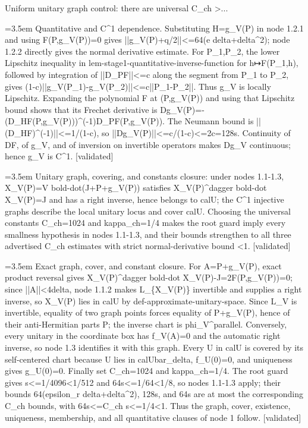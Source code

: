 \documentclass{article}
\newcommand{\step}[1]{\par\noindent\hangindent=3.5em\hangafter=1%
  \makebox[3.5em][l]{\textbf{#1.}}}
\newcommand{\steptag}[1]{\hfill{\small\textsf{[#1]}}}
\begin{document}
\begin{proofbox}{Uniform unitary graph control: there are universal C\_ch >...}
\step{1.3.2} Quantitative and C\textasciicircum{}1 dependence. Substituting H=g\_V(P) in node 1.2.1 and using F(P,g\_V(P))=0 gives ||g\_V(P)+q/2||<=64(e delta+delta\textasciicircum{}2); node 1.2.2 directly gives the normal derivative estimate. For P\_1,P\_2, the lower Lipschitz inequality in lem-stage1-quantitative-inverse-function for h↦F(P\_1,h), followed by integration of ||D\_PF||<=c along the segment from P\_1 to P\_2, gives (1-c)||g\_V(P\_1)-g\_V(P\_2)||<=c||P\_1-P\_2||. Thus g\_V is locally Lipschitz. Expanding the polynomial F at (P,g\_V(P)) and using that Lipschitz bound shows that its Frechet derivative is Dg\_V(P)=-(D\_HF(P,g\_V(P)))\textasciicircum{}(-1)D\_PF(P,g\_V(P)). The Neumann bound is ||(D\_HF)\textasciicircum{}(-1)||<=1/(1-c), so ||Dg\_V(P)||<=c/(1-c)<=2c=128s. Continuity of DF, of g\_V, and of inversion on invertible operators makes Dg\_V continuous; hence g\_V is C\textasciicircum{}1. \steptag{validated} \\[4pt]
\step{1.4} Unitary graph, covering, and constants closure: under nodes 1.1-1.3, X\_V(P)=V bold-dot(J+P+g\_V(P)) satisfies X\_V(P)\textasciicircum{}dagger bold-dot X\_V(P)=J and has a right inverse, hence belongs to calU; the C\textasciicircum{}1 injective graphs describe the local unitary locus and cover calU. Choosing the universal constants C\_ch=1024 and kappa\_ch=1/4 makes the root guard imply every smallness hypothesis in nodes 1.1-1.3, and their bounds strengthen to all three advertised C\_ch estimates with strict normal-derivative bound <1. \steptag{validated} \\[6pt]
\step{1.4.1} Exact graph, cover, and constant closure. For A=P+g\_V(P), exact product reversal gives X\_V(P)\textasciicircum{}dagger bold-dot X\_V(P)-J=2F(P,g\_V(P))=0; since ||A||<4delta, node 1.1.2 makes L\_\{X\_V(P)\} invertible and supplies a right inverse, so X\_V(P) lies in calU by def-approximate-unitary-space. Since L\_V is invertible, equality of two graph points forces equality of P+g\_V(P), hence of their anti-Hermitian parts P; the inverse chart is phi\_V\textasciicircum{}parallel. Conversely, every unitary in the coordinate box has f\_V(A)=0 and the automatic right inverse, so node 1.3 identifies it with this graph. Every U in calU is covered by its self-centered chart because U lies in calUbar\_delta, f\_U(0)=0, and uniqueness gives g\_U(0)=0. Finally set C\_ch=1024 and kappa\_ch=1/4. The root guard gives s<=1/4096<1/512 and 64s<=1/64<1/8, so nodes 1.1-1.3 apply; their bounds 64(epsilon\_r delta+delta\textasciicircum{}2), 128s, and 64s are at most the corresponding C\_ch bounds, with 64s<=C\_ch s<=1/4<1. Thus the graph, cover, existence, uniqueness, membership, and all quantitative clauses of node 1 follow. \steptag{validated} \\[6pt]

\end{proofbox}
\end{document}

